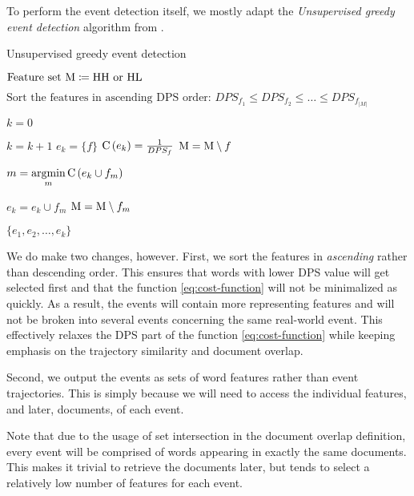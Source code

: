 To perform the event detection itself, we mostly adapt the \textit{Unsupervised greedy event detection} algorithm from \cite{event-detection}.

\begin{algorithm}[H]
\begin{algorithmic}[1]
\caption{Unsupervised greedy event detection}
\Input $\text{Feature set} ~ \text{M} \coloneqq \text{HH or HL}$

\State $\text{Sort the features in ascending DPS order: } DPS_{f_{1}} \leq DPS_{f_{2}} \leq \dots \leq DPS_{f_{\left\vert M \right\vert}}$

\State $k = 0$

	\State $k = k + 1$	
	\State $e_{k} = \{ f \}$
	\State $\text{C} \left(e_{k} \right) = \frac{1}{DPS_{f}}$
	\State $\text{M} = \text{M} \setminus f$
	
		\State $m = \operatorname*{argmin}\limits_{m}{\text{C} \left( e_{k} \cup f_{m} \right)}$

			\State $e_{k} = e_{k} \cup f_{m}$
			\State $\text{M} = \text{M} \setminus f_{m}$
		\Else
			\Break
		\EndIf
	\EndWhile
\EndFor

\Output $\{ e_{1}, e_{2}, \dots, e_{k} \}$
\end{algorithmic}
\end{algorithm}

We do make two changes, however. First, we sort the features in \textit{ascending} rather than descending order. This ensures that words with lower DPS value will get selected first and that the function \ref{eq:cost-function} will not be minimalized as quickly. As a result, the events will contain more representing features and will not be broken into several events concerning the same real-world event. This effectively relaxes the DPS part of the function \ref{eq:cost-function} while keeping emphasis on the trajectory similarity and document overlap.

Second, we output the events as sets of word features rather than event trajectories. This is simply because we will need to access the individual features, and later, documents, of each event.

Note that due to the usage of set intersection in the document overlap definition, every event will be comprised of words appearing in exactly the same documents. This makes it trivial to retrieve the documents later, but tends to select a relatively low number of features for each event.